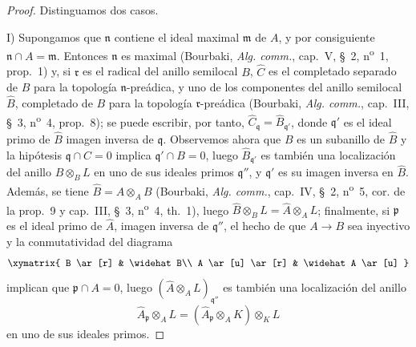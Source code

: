 \begin{proof}
Distinguamos dos casos.

I) Supongamos que $\mathfrak n$ contiene el ideal maximal $\mathfrak m$ de
$A$, y por consiguiente $\mathfrak n\cap A=\mathfrak m$. Entonces
$\mathfrak n$ es maximal (Bourbaki, \emph{Alg. comm.}, cap.~V, §~2,
n\textsuperscript{o}~1, prop.~1) y, si $\mathfrak r$ es el radical del anillo
semilocal $B$, $\widehat C$ es el completado separado de $B$ para la topología
$\mathfrak n$-preádica, y uno de los componentes del anillo semilocal
$\widehat B$, completado de $B$ para la topología $\mathfrak r$-preádica
(Bourbaki, \emph{Alg. comm.}, cap.~III, §~3, n\textsuperscript{o}~4,
prop.~8); se puede escribir, por tanto,
$\widehat C_\mathfrak q=\widehat B_{\mathfrak q'}$, donde $\mathfrak q'$ es
el ideal primo de $\widehat B$ imagen inversa de $\mathfrak q$. Observemos
ahora que $B$ es un subanillo de $\widehat B$ y la hipótesis
$\mathfrak q\cap C=0$ implica $\mathfrak q'\cap B=0$, luego
$\widehat B_{\mathfrak q'}$ es también una localización del anillo
$\widehat B\otimes_B L$ en uno de sus ideales primos $\mathfrak q''$, y
$\mathfrak q'$ es su imagen inversa en $\widehat B$. Además, se tiene
$\widehat B=\widehat A\otimes_A B$ (Bourbaki, \emph{Alg. comm.}, cap.~IV,
§~2, n\textsuperscript{o}~5, cor. de la prop.~9 y cap.~III, §~3,
n\textsuperscript{o}~4, th.~1), luego
$\widehat B\otimes_B L=\widehat A\otimes_A L$; finalmente, si $\mathfrak p$
es el ideal primo de $\widehat A$, imagen inversa de $\mathfrak q''$, el
hecho de que $A\to B$ sea inyectivo y la conmutatividad del diagrama
\[
  \xymatrix{
    B \ar[r] & \widehat B\\
    A \ar[u] \ar[r] & \widehat A \ar[u]
  }
\]
implican que $\mathfrak p\cap A=0$, luego
$(\widehat A\otimes_A L)_{\mathfrak q''}$ es también una localización del
anillo
\[
  \widehat A_\mathfrak p\otimes_A L
  =(\widehat A_\mathfrak p\otimes_A K)\otimes_K L
\]
en uno de sus ideales primos.



\end{proof}
